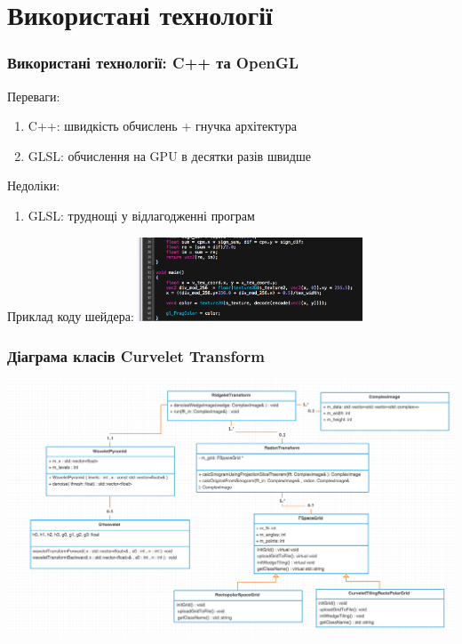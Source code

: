 \documentclass[12pt]{beamer}
\begin{document}
\section{Використані технології}
\begin{frame}\frametitle{Використані технології: C++ та OpenGL}
	Переваги:
	\begin{enumerate}
		\item C++: швидкість обчислень  + гнучка архітектура
		\item GLSL: обчислення на GPU в десятки разів швидше  
	\end{enumerate}
	Недоліки:
	\begin{enumerate}
		\item GLSL: труднощі у відлагодженні програм
	\end{enumerate}

	Приклад коду шейдера:
	\includegraphics[height=2.5cm]{images/shader_snapshot}
\end{frame}

\begin{frame}\frametitle{Діаграма класів Curvelet Transform}
	\includegraphics[scale=0.2]{images/class_diagram}
\end{frame}
\end{document}
